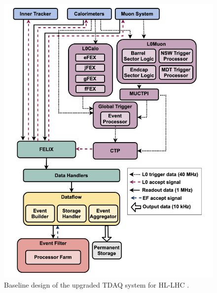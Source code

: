 \begin{figure}[htbp]
  \centering
  \includegraphics[width=1.0\textwidth]{figs/chapter2/TDAQ_baseline_new.png}
  \caption{Baseline design of the upgraded TDAQ system for HL-LHC \cite{TDAQ_TDR_EF}.}
  \label{fig:TDAQ_baseline}
\end{figure}

